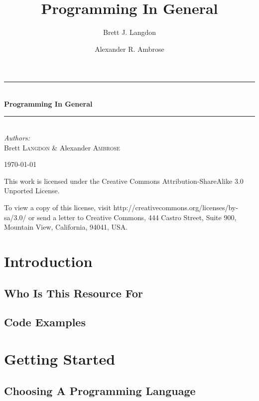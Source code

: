 \documentclass[10pt,a4paper,titlepage]{book}
\author{
  Brett J. Langdon
  \and
  Alexander R. Ambrose
}
\title{Programming In General}
\newcommand{\HRule}{\rule{\linewidth}{0.5mm}}
\begin{document}
\begin{titlepage}
\begin{center}

\vspace*{3 in}

\HRule \\[0.4cm]
{\huge \bfseries Programming In General}
\HRule \\[0.4cm]

\emph{Authors:}\\
Brett \textsc{Langdon}
\&
Alexander \textsc{Ambrose}

\vfill

{\large \today}

\end{center}
\end{titlepage}

\null
\vfill
This work is licensed under the Creative Commons Attribution-ShareAlike 3.0 Unported License.
\par
To view a copy of this license, visit http://creativecommons.org/licenses/by-sa/3.0/ or send a letter to Creative Commons, 444 Castro Street, Suite 900, Mountain View, California, 94041, USA.
\vfill
\null

\tableofcontents

\chapter{Introduction}

\vfill
\pagebreak
\section{Who Is This Resource For}

\vfill
\pagebreak
\section{Code Examples}

\vfill
\pagebreak
\chapter{Getting Started}

\vfill
\pagebreak
\section{Choosing A Programming Language}

\vfill
\pagebreak
\end{document}
